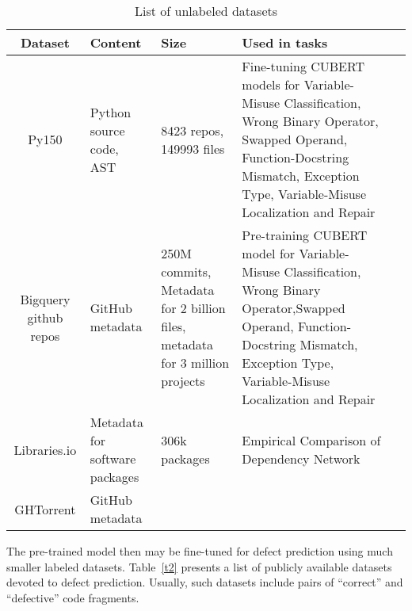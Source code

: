 \documentclass{article}
\begin{document}
\begin{table}[hbtp]
\footnotesize
\renewcommand{\arraystretch}{1.4}
\centering
\begin{tabulary}{1.0\textwidth}{|C|L|L|L|l}
\hline
Dataset & Content & Size & \parbox{10em}{Used in tasks}\\
\hline
Py150 & Python source code, AST & 8423 repos, 149993 files & Fine-tuning CUBERT models for Variable-Misuse Classification, Wrong Binary Operator, Swapped Operand, Function-Docstring Mismatch, Exception Type, Variable-Misuse Localization and Repair \\  \hline
Bigquery github repos & GitHub metadata	& 250M commits, Metadata for 2 billion files, metadata for 3 million projects & Pre-training CUBERT model for  Variable-Misuse Classification, Wrong Binary Operator,Swapped Operand, Function-Docstring Mismatch, Exception Type, Variable-Misuse Localization and Repair \\  \hline
Libraries.io & Metadata for software packages & 306k packages & Empirical Comparison of Dependency Network \\  \hline
GHTorrent & GitHub metadata & &	\\  \hline
\end{tabulary}
\caption{List of unlabeled datasets}
\label{t1}
\end{table}

The pre-trained model then may be fine-tuned for defect prediction using much smaller labeled datasets. Table~\ref{t2} presents a list of publicly available datasets devoted to defect prediction. Usually, such datasets include pairs of ``correct'' and ``defective'' code fragments. 
\end{document}
